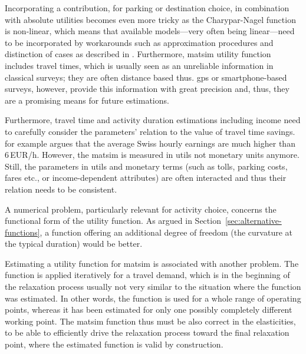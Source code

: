Incorporating a contribution, \eg for parking or destination choice, in combination with absolute utilities becomes even more tricky as the Charypar-Nagel function is non-linear, which means that available models---very often being linear---need to be incorporated by workarounds such as approximation procedures and distinction of cases as described in \citet[][p.75ff]{Horni_PhDThesis_2013}. Furthermore, \gls{matsim} utility function includes travel times, which is usually seen as an unreliable information in classical surveys; they are often distance based thus. \gls{gps} or smartphone-based surveys, however, provide this information with great precision and, thus, they are a promising means for future estimations.

Furthermore, travel time and activity duration estimations including income need to carefully consider the parameters' relation to the value of travel time savings. \citet[][p.276]{MeisterEtAl_SVT_2009} for example argues that the average Swiss hourly earnings are much higher than 6\,EUR/h. However, the \gls{matsim} is measured in utils not monetary units anymore. Still, the parameters in utils and monetary terms (such as tolls, parking costs, fares etc., or income-dependent attributes) are often interacted and thus their relation needs to be consistent.
%

A numerical problem, particularly relevant for activity choice, concerns the functional form of the utility function. As argued in Section~\ref{sec:alternative-functions}, a function offering an additional degree of freedom (the curvature at the typical duration) would be better.

Estimating a utility function for \gls{matsim} is associated with another problem. The function is applied iteratively for a travel demand, which is in the beginning of the relaxation process usually not very similar to the situation where the function was estimated. In other words, the function is used for a whole range of operating points, whereas it has been estimated for only one possibly completely different working point. The \gls{matsim} function thus must be also correct in the elasticities, to be able to efficiently drive the relaxation process toward the final relaxation point, where the estimated function is valid by construction. 

